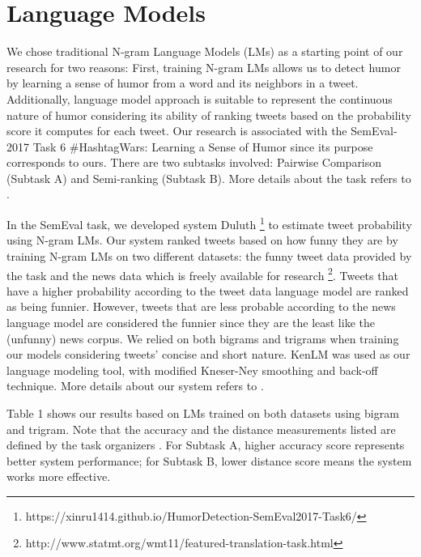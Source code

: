 \documentclass[11pt,a4paper]{article}
\begin{document}
\section{Language Models}
We chose traditional N-gram Language Models (LMs) as a starting point of our research for two reasons: First, training N-gram LMs allows us to detect humor by learning a sense of humor from a word and its neighbors in a tweet. Additionally, language model approach is suitable to represent the continuous nature of humor considering its ability of ranking tweets based on the probability score it computes for each tweet. Our research is associated with the SemEval-2017 Task 6 \#HashtagWars: Learning a Sense of Humor \cite{PotashRR17} since its purpose corresponds to ours. There are two subtasks involved: Pairwise Comparison (Subtask A) and Semi-ranking (Subtask B). More details about the task refers to \cite{PotashRR17}. 

In the SemEval task, we developed system Duluth \footnote{https://xinru1414.github.io/HumorDetection-SemEval2017-Task6/} to estimate tweet probability using N-gram LMs. Our system ranked tweets based on how funny they are by training N-gram LMs on two different datasets: the funny tweet data provided by the task and the news data which is freely available for research \footnote{http://www.statmt.org/wmt11/featured-translation-task.html}. Tweets that have a higher probability according to the tweet data language model are ranked as being funnier. However, tweets that are less probable according to the news language model are considered the funnier since they are the least like the (unfunny) news corpus. We relied on both bigrams and trigrams when training our models considering tweets' concise and short nature. KenLM \cite{Heafield-estimate} was used as our language modeling tool, with modified Kneser-Ney smoothing and back-off technique. More details about our system refers to \cite{XT}.

Table 1 shows our results based on LMs trained on both datasets using bigram and trigram. Note that the accuracy and the distance measurements listed are defined by the task organizers \cite{PotashRR17}. For Subtask A, higher accuracy score represents better system performance; for Subtask B, lower distance score means the system works more effective.
\end{document}
